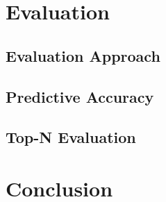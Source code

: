 \section{Evaluation}
\label{sec:4 Evaluation}


\subsection{Evaluation Approach}
\label{subsec:4 Evaluation Approach}


\subsection{Predictive Accuracy}
\label{subsubsec:4 Predictive Accuracy}


\subsection{Top-N Evaluation}
\label{subsubsec:4 Top-N Evaluation}

\section{Conclusion}
\label{sec:4 Conclusion for Methodology}


